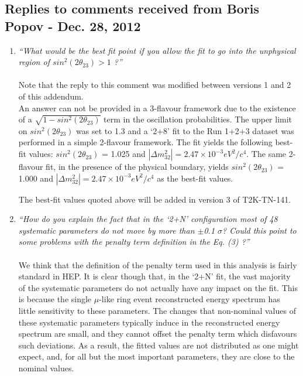 \subsection{
  Replies to comments received from Boris Popov - Dec. 28, 2012 }

\begin{enumerate}

\vspace{5 mm}
\item
{\em
   ``What would be the best fit point if you allow the fit to go into the 
   unphysical region of $sin^{2}(2\theta_{23}) > 1$ ?''
}\\
\\
{\color{red}Note that the reply to this comment was modified between versions 1 and 2 of this addendum.}\\

An answer can not be provided in a 3-flavour
framework due to the existence of a $\sqrt{1-sin^{2}(2\theta_{23})}$ term in the oscillation probabilities.
The upper limit on $sin^{2}(2\theta_{23})$ was set to 1.3 and a `2+8'
fit to the Run 1+2+3 dataset was performed in a simple 2-flavour framework.
The fit yields the following best-fit values:
$sin^{2}(2\theta_{23})$ = 1.025 and
$|\Delta m^2_{32}| = 2.47 \times 10^{-3} eV^2/c^4$.
The same 2-flavour fit, in the presence of the physical boundary, yields
$sin^{2}(2\theta_{23})$ = 1.000 and
$|\Delta m^2_{32}| = 2.47 \times 10^{-3} eV^2/c^4$
as the best-fit values.

The best-fit values quoted above will be added in version 3 of T2K-TN-141.

\vspace{5 mm}
\item
{\em
   ``How do you explain the fact that in the `2+N' configuration most of 48 systematic parameters 
   do not move by more than $\pm$0.1 $\sigma$? Could this point to some problems with the 
   penalty term definition in the Eq. (3) ?''
}\\
\\
We think that the definition of the penalty term used in this analysis is fairly standard in HEP.
It is clear though that, in the `2+N' fit, the vast majority of the systematic parameters do not
actually have any impact on the fit. This is because the single $\mu$-like ring event reconstructed 
energy  spectrum has little sensitivity to these parameters. The changes that non-nominal values of these
systematic parameters typically induce in the reconstructed energy spectrum are small, and they cannot 
offset the penalty term which disfavours such deviations. As a result, the fitted values are not distributed as 
one might expect, and, for all but the most important parameters, they are close to the nominal values.


\end{enumerate}
